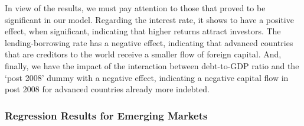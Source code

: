 \documentclass[
]{article}
\begin{document}
In view of the results, we must pay attention to those that proved to be
significant in our model. Regarding the interest rate, it shows to have
a positive effect, when significant, indicating that higher returns
attract investors. The lending-borrowing rate has a negative effect,
indicating that advanced countries that are creditors to the world
receive a smaller flow of foreign capital. And, finally, we have the
impact of the interaction between debt-to-GDP ratio and the `post 2008'
dummy with a negative effect, indicating a negative capital flow in post
2008 for advanced countries already more indebted.

\hypertarget{regression-results-for-emerging-markets}{%
\subsubsection{Regression Results for Emerging
Markets}\label{regression-results-for-emerging-markets}}
\end{document}
